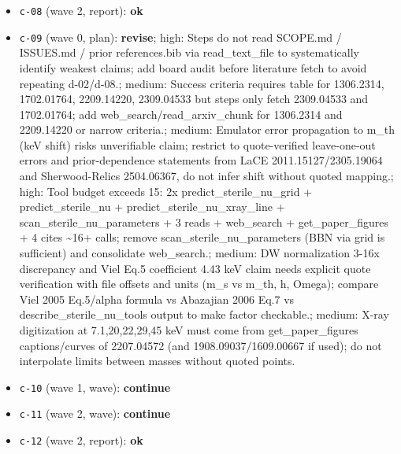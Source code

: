 \documentclass[11pt,a4paper]{article}
\begin{document}
\begin{itemize}
  \item \texttt{c-08} (wave 2, report): \textbf{ok}
  \item \texttt{c-09} (wave 0, plan): \textbf{revise}; high: Steps do not read SCOPE.md / ISSUES.md / prior references.bib via read\_text\_file to systematically identify weakest claims; add board audit before literature fetch to avoid repeating d-02/d-08.; medium: Success criteria requires table for 1306.2314, 1702.01764, 2209.14220, 2309.04533 but steps only fetch 2309.04533 and 1702.01764; add web\_search/read\_arxiv\_chunk for 1306.2314 and 2209.14220 or narrow criteria.; medium: Emulator error propagation to m\_th (keV shift) risks unverifiable claim; restrict to quote-verified leave-one-out errors and prior-dependence statements from LaCE 2011.15127/2305.19064 and Sherwood-Relics 2504.06367, do not infer shift without quoted mapping.; high: Tool budget exceeds 15: 2x predict\_sterile\_nu\_grid + predict\_sterile\_nu + predict\_sterile\_nu\_xray\_line + scan\_sterile\_nu\_parameters + 3 reads + web\_search + get\_paper\_figures + 4 cites \textasciitilde{}16+ calls; remove scan\_sterile\_nu\_parameters (BBN via grid is sufficient) and consolidate web\_search.; medium: DW normalization 3-16x discrepancy and Viel Eq.5 coefficient 4.43 keV claim needs explicit quote verification with file offsets and units (m\_s vs m\_th, h, Omega); compare Viel 2005 Eq.5/alpha formula vs Abazajian 2006 Eq.7 vs describe\_sterile\_nu\_tools output to make factor checkable.; medium: X-ray digitization at 7.1,20,22,29,45 keV must come from get\_paper\_figures captions/curves of 2207.04572 (and 1908.09037/1609.00667 if used); do not interpolate limits between masses without quoted points.
  \item \texttt{c-10} (wave 1, wave): \textbf{continue}
  \item \texttt{c-11} (wave 2, wave): \textbf{continue}
  \item \texttt{c-12} (wave 2, report): \textbf{ok}
\end{itemize}
\end{document}
